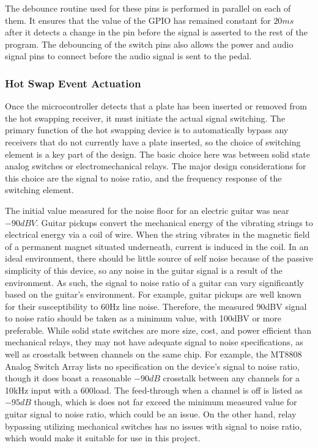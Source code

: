 		The debounce routine used for these pins is performed in parallel on each of them.  It ensures that the value of the GPIO has remained constant for $20ms$ after it detects a change in the pin before the signal is asserted to the rest of the program.  The debouncing of the switch pins also allows the power and audio signal pins to connect before the audio signal is sent to the pedal.

		\subsubsection{Hot Swap Event Actuation}

		Once the microcontroller detects that a plate has been inserted or removed from the hot swapping receiver, it must initiate the actual signal switching.  The primary function of the hot swapping device is to automatically bypass any receivers that do not currently have a plate inserted, so the choice of switching element is a key part of the design. The basic choice here was between solid state analog switches or electromechanical relays. The major design considerations for this choice are the signal to noise ratio, and the frequency response of the switching element. 

		The initial value measured for the noise floor for an electric guitar was near $-90dBV$.  Guitar pickups convert the mechanical energy of the vibrating strings to electrical energy via a coil of wire. When the string vibrates in the magnetic field of a permanent magnet situated underneath, current is induced in the coil. In an ideal environment, there should be little source of self noise because of the passive simplicity of this device, so any noise in the guitar signal is a result of the environment. As such, the signal to noise ratio of a guitar can vary significantly based on the guitar’s environment. For example, guitar pickups are well known for their susceptibility to 60Hz line noise. Therefore, the measured 90dBV signal to noise ratio should be taken as a minimum value, with 100dBV or more preferable. While solid state switches are more size, cost, and power efficient than mechanical relays, they may not have adequate signal to noise specifications, as well as crosstalk between channels on the same chip. For example, the MT8808 Analog Switch Array lists no specification on the device’s signal to noise ratio, though it does boast a reasonable $-90dB$ crosstalk between any channels for a 10kHz input with a 600\ohm load. The feed-through when a channel is off is listed as $-95dB$ though, which is does not far exceed the minimum measured value for guitar signal to noise ratio, which could be an issue. On the other hand, relay bypassing utilizing mechanical switches has no issues with signal to noise ratio, which would make it suitable for use in this project.

